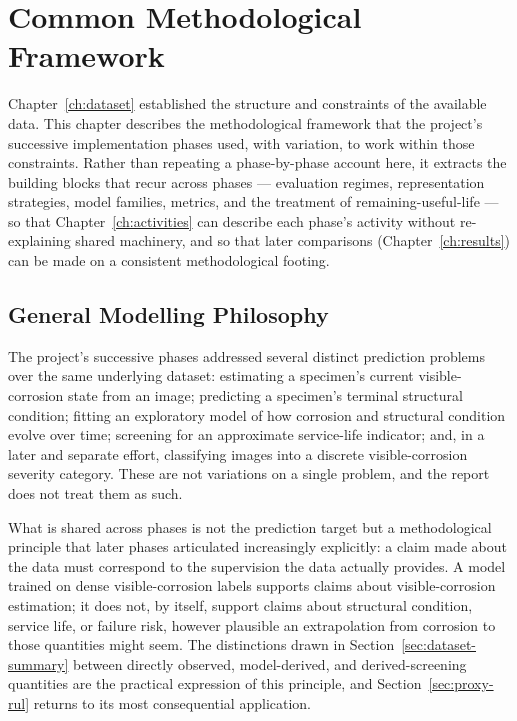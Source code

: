 \chapter{Common Methodological Framework}
\label{ch:framework}

Chapter~\ref{ch:dataset} established the structure and constraints of the
available data. This chapter describes the methodological framework that
the project's successive implementation phases used, with variation, to
work within those constraints. Rather than repeating a phase-by-phase
account here, it extracts the building blocks that recur across phases —
evaluation regimes, representation strategies, model families, metrics,
and the treatment of remaining-useful-life — so that
Chapter~\ref{ch:activities} can describe each phase's activity without
re-explaining shared machinery, and so that later comparisons
(Chapter~\ref{ch:results}) can be made on a consistent methodological
footing.

\section{General Modelling Philosophy}
\label{sec:philosophy}

The project's successive phases addressed several distinct prediction
problems over the same underlying dataset: estimating a specimen's current
visible-corrosion state from an image; predicting a specimen's terminal
structural condition; fitting an exploratory model of how corrosion and
structural condition evolve over time; screening for an approximate
service-life indicator; and, in a later and separate effort, classifying
images into a discrete visible-corrosion severity category. These are not
variations on a single problem, and the report does not treat them as such.

What is shared across phases is not the prediction target but a
methodological principle that later phases articulated increasingly
explicitly: a claim made about the data must correspond to the
supervision the data actually provides. A model trained on dense
visible-corrosion labels supports claims about visible-corrosion
estimation; it does not, by itself, support claims about structural
condition, service life, or failure risk, however plausible an
extrapolation from corrosion to those quantities might seem. The
distinctions drawn in Section~\ref{sec:dataset-summary} between directly
observed, model-derived, and derived-screening quantities are the
practical expression of this principle, and Section~\ref{sec:proxy-rul}
returns to its most consequential application.

